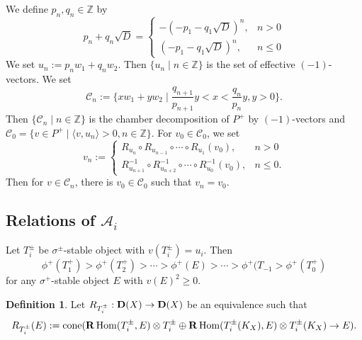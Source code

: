 \documentclass[leqno,11pt]{amsart}
\def\Z{\ensuremath{\mathbb{Z}}}
\def\Hom{\mathop{\mathrm{Hom}}\nolimits}
\theoremstyle{definition}
\newtheorem{Def}[Thm]{Definition}
\def\Z{\ensuremath{\mathbb{Z}}}
\def\AA{\ensuremath{\mathcal A}}
\def\CC{\ensuremath{\mathcal C}}
\begin{document}
We define $p_n, q_n \in\Z$ by
\begin{equation}
p_n+q_n \sqrt{D}=
\begin{cases}
-(-p_1-q_1 \sqrt{D})^n, & n > 0\\
(-p_1-q_1 \sqrt{D})^n, & n \leq 0
\end{cases}
\end{equation}
We set $u_n:=p_n w_1+q_n w_2$.
Then $\{ u_n \mid n \in \Z\}$ is the set of effective $(-1)$-vectors.
We set
\begin{equation}
\CC_n:=\{x w_1+y w_2 \mid \frac{q_{n+1}}{p_{n+1}}y<x<\frac{q_n}{p_n}y, y>0 \}.
\end{equation}
Then $\{\CC_n \mid n \in \Z \}$ is the chamber decomposition
of $P^+$ by $(-1)$-vectors and 
$\CC_0=\{ v \in P^+ \mid \langle v, u_n \rangle>0, n \in \Z \}$.
For $v_0 \in \CC_0$, 
we set 
\begin{equation}
v_n:= 
\begin{cases}
R_{u_n} \circ R_{u_{n-1}} \circ \cdots \circ R_{u_1}(v_0), & n>0\\
R_{u_{n+1}}^{-1} \circ R_{u_{n+2}}^{-1} \circ \cdots \circ R_{u_0}^{-1}(v_0), & n \leq 0.
\end{cases}
\end{equation}
Then for $v \in \CC_n$, there is $v_0 \in \CC_0$ such that
$v_n=v_0$.


\subsection{Relations of $\AA_i$}



Let $T_i^{\pm}$ be $\sigma^{\pm}$-stable object with
$v(T_i^{\pm})=u_i$.
Then 
\begin{equation}
\phi^+(T_1^+) > \phi^+(T_2^+)>\cdots>\phi^+(E)>
\cdots >\phi^+(T_{-1}>\phi^+(T_0^+)
\end{equation}
for any $\sigma^+$-stable object $E$ with
$v(E)^2 \geq 0$.


\begin{Def}
Let $R_{T_i^\pm}:{\bf D}(X) \to {\bf D}(X)$ be an equivalence such that
\begin{equation}
R_{T_i^\pm}(E):=\mathrm{cone}({\bf R}\Hom(T_i^\pm,E)\otimes T_i^\pm  \oplus 
{\bf R}\Hom(T_i^\pm (K_X),E) \otimes T_i^\pm (K_X) \to E).
\end{equation}
\end{Def}
\end{document}
